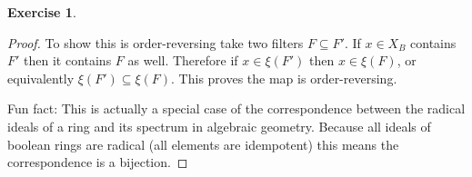 \documentclass{article}
\theoremstyle{definition}
\newtheorem{question}{Exercise}
\begin{document}
\begin{question}
\begin{proof}
        To show this is order-reversing take two filters \(F\subseteq F'\). If
        \(x\in X_{B}\) contains \(F'\) then it contains \(F\) as well. Therefore
        if \(x\in \xi(F')\) then \(x\in\xi(F)\), or equivalently
        \(\xi(F')\subseteq\xi(F)\). This proves the map is order-reversing.

        Fun fact: This is actually a special case of the correspondence between
        the radical ideals of a ring and its spectrum in algebraic geometry.
        Because all ideals of boolean rings are radical (all elements are
        idempotent) this means the correspondence is a bijection.
    \end{proof}
\end{question}
\end{document}

